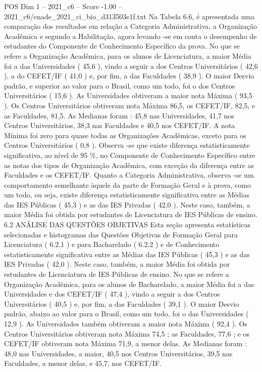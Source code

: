 \begin{textsample}{POS Dim 1 – 2021\_c6 – Score -1.00 – 2021\_c6/enade\_2021\_ci\_bio\_d313503e1f.txt}
Na Tabela 6.6, é apresentada uma comparação dos resultados em relação a Categoria Administrativa, a Organização Acadêmica e segundo a Habilitação, agora levando -se em conta o desempenho de estudantes do Componente de Conhecimento Específico da prova.
No que se refere a Organização Acadêmica, para os alunos de Licenciatura, a maior Média foi a das Universidades ( 45,6 ), vindo a seguir a dos Centros Universitários ( 42,6 ), a do CEFET/IF ( 41,0 ) e, por fim, a das Faculdades ( 38,9 ).
O maior Desvio padrão, e superior ao valor para o Brasil, como um todo, foi o dos Centros Universitários ( 15,6 ).
As Universidades obtiveram a maior nota Máxima ( 93,5 ).
Os Centros Universitários obtiveram nota Máxima 86,5, os CEFET/IF, 82,5, e as Faculdades, 81,5.
As Medianas foram : 45,8 nas Universidades, 41,7 nos Centros Universitários, 38,3 nas Faculdades e 40,5 nos CEFET/IF.
A nota Mínima foi zero para quase todas as Organizações Acadêmicas, exceto para os Centros Universitários ( 0,8 ).
Observa -se que existe diferença estatisticamente significativa, ao nível de 95 \%, no Componente de Conhecimento Específico entre as notas dos tipos de Organização Acadêmica, com exceção da diferença entre as Faculdades e os CEFET/IF.
Quanto a Categoria Administrativa, observa -se um comportamento semelhante àquele da parte de Formação Geral e à prova, como um todo, ou seja, existe diferença estatisticamente significativa entre as Médias das IES Públicas ( 45,3 ) e as das IES Privadas ( 42,0 ).
Neste caso, também, a maior Média foi obtida por estudantes de Licenciatura de IES Públicas de ensino. 6.2 ANÁLISE DAS QUESTÕES OBJETIVAS Esta seção apresenta estatísticas selecionadas e histogramas das Questões Objetivas de Formação Geral para Licenciatura ( 6.2.1 ) e para Bacharelado ( 6.2.2 ) e de Conhecimento estatisticamente significativa entre as Médias das IES Públicas ( 45,3 ) e as das IES Privadas ( 42,0 ).
Neste caso, também, a maior Média foi obtida por estudantes de Licenciatura de IES Públicas de ensino.
No que se refere a Organização Acadêmica, para os alunos de Bacharelado, a maior Média foi a das Universidades e dos CEFET/IF ( 47,4 ), vindo a seguir a dos Centros Universitários ( 40,5 ) e, por fim, a das Faculdades ( 39,1 ).
O maior Desvio padrão, abaixo ao valor para o Brasil, como um todo, foi o das Universidades ( 12,9 ).
As Universidades também obtiveram a maior nota Máxima ( 92,4 ).
Os Centros Universitários obtiveram nota Máxima 74,5 ; as Faculdades, 77,6 ; e os CEFET/IF obtiveram nota Máxima 71,9, a menor delas.
As Medianas foram : 48,0 nas Universidades, a maior, 40,5 nos Centros Universitários, 39,5 nas Faculdades, a menor delas, e 45,7, nos CEFET/IF.

\end{textsample}
